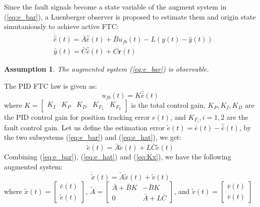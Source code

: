\documentclass{ieeeaccess}
\newtheorem{assumption}{Assumption}[section]
\begin{document}
Since the fault signals become a state variable of the augment system in (\ref{eq:e_bar}), a Luenberger observer is proposed to estimate them and origin state simutaniously to achieve active FTC:
\begin{equation} \label{eq:e_hat}
    \begin{split}
        & \dot{\hat{\bar{e}}}(t)=\bar{A}\hat{\bar{e}}(t)+\bar{B}u_{fb}(t)-{L}(y(t)-\hat{y}(t)) \\
        & \hat{y}(t)=\bar{C}\hat{\bar{e}}(t) + C\pmb{r}(t)
    \end{split}
\end{equation}
\begin{assumption}
    The augmented system (\ref{eq:e_bar}) is observable.
\end{assumption}
The PID FTC law is given as:
\begin{equation} \label{eq:Kx}
    u_{fb}(t)=K\hat{\bar{e}}(t)
\end{equation}
where $K = \begin{bmatrix}
    K_I & K_P & K_D & K_{F_1} & K_{F_2}
\end{bmatrix}$ is the total control gain, $K_P,K_I,K_D$ are the PID control gain for position tracking error $e(t)$, and $K_{F_i}, i=1,2$ are the fault control gain. Let us define the estimation error $\tilde{e}(t)=\bar{e}(t)-\hat{\bar{e}}(t)$, by the two subsystems (\ref{eq:e_bar}) and (\ref{eq:e_hat}), we get:
\begin{equation} \label{eq:e_tilde}
    \dot{\tilde{e}}(t) = \bar{A}\tilde{e}(t) +L\bar{C}\tilde{e}(t)
\end{equation}
Combining (\ref{eq:e_bar}), (\ref{eq:e_hat}) and (\ref{eq:Kx}), we have the following augmented system:
\begin{equation} \label{eq:aug}
    \dot{\tilde{x}}(t) = \tilde{A}\tilde{x}(t)+\tilde{v}(t)
\end{equation}
where $\tilde{x}(t)=\begin{bmatrix}
    \bar{e}(t) \\ \tilde{e}(t)
\end{bmatrix}$, $\tilde{A}=\begin{bmatrix}
    \bar{A}+\bar{B}K & -\bar{B}K \\ 0 & \bar{A}+L\bar{C}
\end{bmatrix}$, and $\tilde{v}(t)=\begin{bmatrix}
    \bar{v}(t) \\ \bar{v}(t)
\end{bmatrix}$
\end{document}
